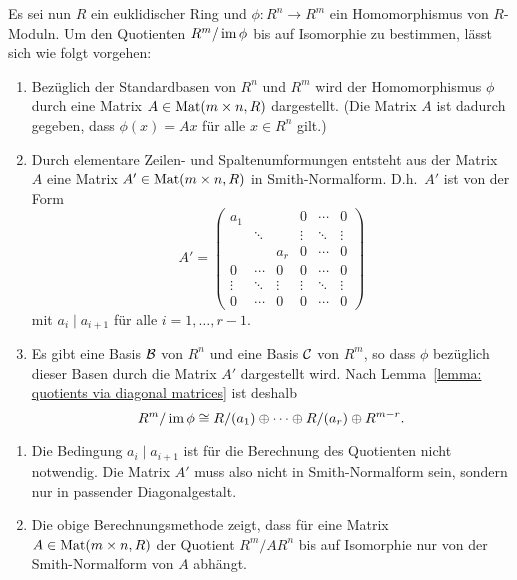 \documentclass[a4paper,10pt,numbers=noenddot]{scrartcl}
\begin{document}
Es sei nun $R$ ein euklidischer Ring und $\phi \colon R^n \to R^m$ ein Homomorphismus von $R$-Moduln.
Um den Quotienten $R^m / \operatorname{im} \phi$ bis auf Isomorphie zu bestimmen, lässt sich wie folgt vorgehen:
\begin{enumerate}
  \item
    Bezüglich der Standardbasen von $R^n$ und $R^m$ wird der Homomorphismus $\phi$ durch eine Matrix $A \in \operatorname{Mat}(m \times n, R)$ dargestellt.
    (Die Matrix $A$ ist dadurch gegeben, dass $\phi(x) = Ax$ für alle $x \in R^n$ gilt.)
  \item
    Durch elementare Zeilen- und Spaltenumformungen entsteht aus der Matrix $A$ eine Matrix $A' \in \operatorname{Mat}(m \times n, R)$ in Smith-Normalform.
    D.h.\ $A'$ ist von der Form
    \[
        A'
      = \begin{pmatrix}
          a_1     &         &         & 0       & \cdots  & 0       \\
                  & \ddots  &         & \vdots  & \ddots  & \vdots  \\
                  &         & a_r     & 0       & \cdots  & 0       \\
          0       & \cdots  & 0       & 0       & \cdots  & 0       \\
          \vdots  & \ddots  & \vdots  & \vdots  & \ddots  & \vdots  \\
          0       & \cdots  & 0       & 0       & \cdots  & 0
        \end{pmatrix}
    \]
    mit $a_i \mid a_{i+1}$ für alle $i = 1, \dotsc, r-1$.
  \item
    Es gibt eine Basis $\mathcal{B}$ von $R^n$ und eine Basis $\mathcal{C}$ von $R^m$, so dass $\phi$ bezüglich dieser Basen durch die Matrix $A'$ dargestellt wird.
    Nach Lemma~\ref{lemma: quotients via diagonal matrices} ist deshalb
    \[
            R^m / \operatorname{im} \phi
      \cong R/(a_1) \oplus \dotsb \oplus R/(a_r) \oplus R^{m-r}.
    \]
\end{enumerate}


\begin{remark}
  \begin{enumerate}
    \item
      Die Bedingung $a_i \mid a_{i+1}$ ist für die Berechnung des Quotienten nicht notwendig.
      Die Matrix $A'$ muss also nicht in Smith-Normalform sein, sondern nur in passender Diagonalgestalt.
    \item
      Die obige Berechnungsmethode zeigt, dass für eine Matrix $A \in \operatorname{Mat}(m \times n, R)$ der Quotient $R^m / A R^n$ bis auf Isomorphie nur von der Smith-Normalform von $A$ abhängt.
  \end{enumerate}
\end{remark}
\end{document}
